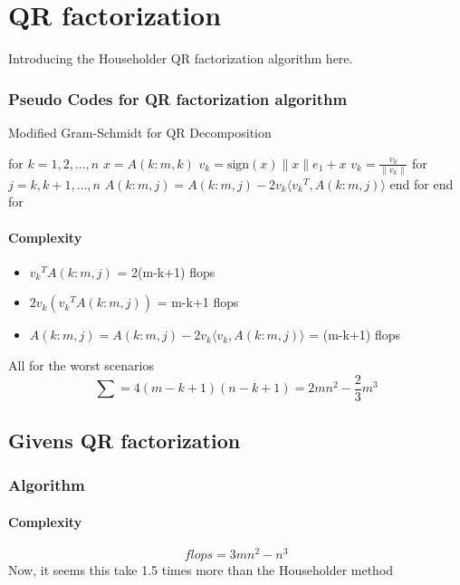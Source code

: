 \chapter{QR factorization}
Introducing the Householder QR factorization algorithm here. 
\subsection{Pseudo Codes for QR factorization algorithm}
\begin{algorithm}
    \caption{Modified Gram-Schmidt for QR Decomposition}
    \begin{algorithmic}
        \STATE for \( k = 1, 2, \dots, n \)
        \STATE \quad \( x = A(k:m, k) \)
        \STATE \quad \( v_k = \text{sign}(x) \|x\| e_1 + x \)
        \STATE \quad \( v_k = \frac{v_k}{\|v_k\|} \)
        \STATE \quad for \( j = k, k+1, \dots, n \)
        \STATE \quad \quad \( A(k:m, j) = A(k:m, j) - 2 v_k \langle {v_k}^T, A(k:m, j) \rangle \)
        \STATE \quad end for
        \STATE end for
    \end{algorithmic}
\end{algorithm}



\subsubsection{Complexity}
\begin{itemize}
    \item ${v_k}^T A(k:m,j)$ = 2(m-k+1) flops
    \item $2v_k({v_k}^T A(k:m,j))$ = m-k+1 flops
    \item  $A(k:m,j) = A(k:m,j) - 2v_k \langle v_k, A(k:m,j)\rangle$ = (m-k+1) flops
\end{itemize}
All for the worst scenarios 
\begin{equation}
    \sum = 4(m-k+1)(n-k+1) = 2mn^2 - \frac{2}{3}m^3
\end{equation}



\section{Givens QR factorization}
\subsection{Algorithm}

\subsubsection{Complexity}
\begin{equation}
    flops = 3mn^2 - n^3
\end{equation}
Now, it seems this take 1.5 times more than the Householder method

